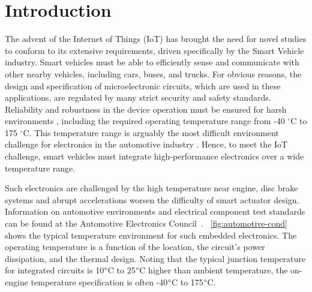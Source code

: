 
\chapter{Introduction}  %

\ifpdf
    \graphicspath{{Chapter1/Figs/Raster/}{Chapter1/Figs/PDF/}{Chapter1/Figs/}}
\else
    \graphicspath{{Chapter1/Figs/Vector/}{Chapter1/Figs/}}
\fi

The advent of the Internet of Things (IoT) has brought the need for novel studies to conform to its extensive requirements, driven specifically by the Smart Vehicle industry.   Smart vehicles must be able to efficiently sense and communicate with other nearby vehicles, including cars, buses, and trucks. For obvious reasons, the design and specification of microelectronic circuits, which are used in these applications, are regulated by many strict security and safety standards. Reliability and robustness in the device operation must be ensured for harsh environments \cite{Ferreira2014}, including the required operating temperature range from -40 $^{\circ}$C to 175 $^{\circ}$C. This temperature range is arguably the most difficult environment challenge for electronics in the automotive industry \cite{Chain1997}. Hence, to meet the IoT challenge, smart vehicles must integrate high-performance electronics over a wide temperature range.

Such electronics are challenged by the high temperature near engine, disc brake systems and abrupt accelerations worsen the difficulty of smart actuator design. Information on automotive environments and electrical component test standards can be found at the Automotive Electronics Council~\cite{1393072,ISO16750}. \figurename~\ref{fig:automotive-cond} shows the typical temperature environment for such embedded electronics. The operating temperature is a function of the location, the circuit's power dissipation, and the thermal design. Noting that the typical junction temperature for integrated circuits is 10\(\degree \)C to 25\(\degree \)C higher than ambient temperature, the on-engine temperature specification is often -40\(\degree \)C to 175\(\degree \)C.

